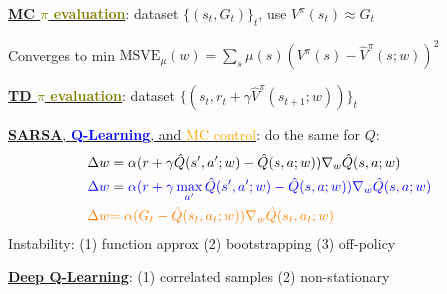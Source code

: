 \documentclass[10pt,landscape]{article}
\begin{document}
\begin{multicols}{3}
\underline{\textbf{MC \textcolor{olive}{$\pi$ evaluation}}}: dataset $\{(s_t,G_t)\}_t$, use $ V^\pi(s_t)\approx G_t$

Converges to min	 $\textrm{MSVE}_\mu(w)=\sum\limits_s\mu(s)(V^\pi(s)-\hat{V}^\pi(s;w))^2$


\underline{\textbf{TD \textcolor{olive}{$\pi$ evaluation}}}: dataset $\{(s_t,r_t+\gamma\hat{V}^\pi(s_{t+1};w))\}_t$%



\underline{\textbf{SARSA},  \textcolor{blue}{\textbf{Q-Learning}}, and \textcolor{orange}{MC control}}: do the same for $Q$:
\begin{align*}
    \Delta w&=
    \alpha(r+\gamma \hat{Q}(s',a';w)-\hat{Q}(s,a;w))\nabla_w \hat{Q}(s,a;w)
    \\
    \textcolor{blue}{\Delta w}&=
    \textcolor{blue}{\alpha(r+\gamma \max\limits_{a'}\hat{Q}(s',a';w)-\hat{Q}(s,a;w))\nabla_w \hat{Q}(s,a;w)}
    \\
    \textcolor{orange}{\Delta w}&\textcolor{orange}{=
    \alpha(G_t-\hat{Q}(s_t,a_t;w))\nabla_w \hat{Q}(s_t,a_t;w)}
\end{align*}
Instability: (1) function approx (2) bootstrapping (3) off-policy

\vspace{1mm}

\underline{\textbf{Deep Q-Learning}}: (1) correlated samples (2) non-stationary 
\begin{algorithm}[H]
\end{algorithm}


\end{multicols}
\end{document}
